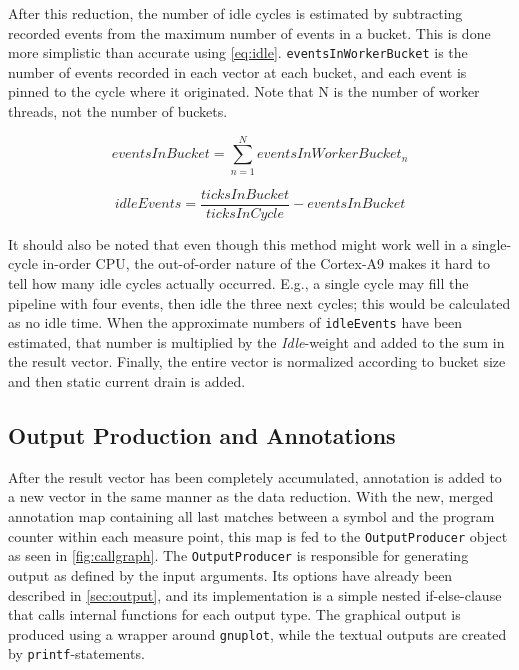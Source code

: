 After this reduction, the number of idle cycles is estimated by subtracting
recorded events from the maximum number of events in a bucket. This is done more
simplistic than accurate using \autoref{eq:idle}. \texttt{eventsInWorkerBucket}
is the number of events recorded in each vector at each bucket, and each event
is pinned to the cycle where it originated. Note that N is the number of worker
threads, not the number of buckets.

\begin{equation}
    eventsInBucket = \sum_{n=1}^{N} eventsInWorkerBucket_n
\end{equation}

\begin{equation}
    idleEvents = \frac{ticksInBucket}{ticksInCycle} - eventsInBucket
\label{eq:idle}
\end{equation}

It should also be noted that even though this method might work well in a
single-cycle in-order CPU, the out-of-order nature of the Cortex-A9 makes it
hard to tell how many idle cycles actually occurred. E.g., a single cycle may fill
the pipeline with four events, then idle the three next cycles; this would be
calculated as no idle time. When the approximate numbers of \texttt{idleEvents}
have been estimated, that number is multiplied by the \emph{Idle}-weight and
added to the sum in the result vector. Finally, the entire vector is normalized
according to bucket size and then static current drain is added.


\subsection{Output Production and Annotations}

After the result vector has been completely accumulated, annotation is added to
a new vector in the same manner as the data reduction. With the new, merged
annotation map containing all last matches between a symbol and the program
counter within each measure point, this map is fed to the
\texttt{OutputProducer} object as seen in \autoref{fig:callgraph}. The
\texttt{OutputProducer} is responsible for generating output as defined by the
input arguments. Its options have already been described in
\autoref{sec:output}, and its implementation is a simple nested if-else-clause
that calls internal functions for each output type. The graphical output is
produced using a wrapper around \texttt{gnuplot}, while the textual outputs are
created by \texttt{printf}-statements.


